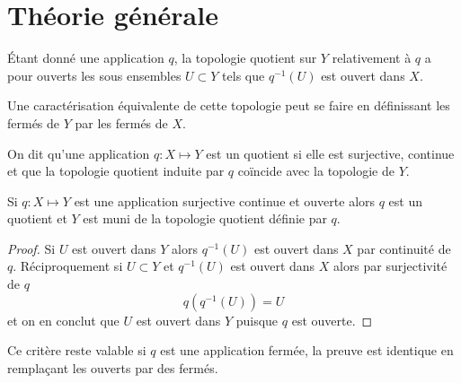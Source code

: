 \documentclass[main.tex]{subfiles}
\begin{document}
	\section{Théorie générale}
	\begin{definition}
		Étant donné une application $q$, la topologie quotient sur $Y$ relativement à $q$ a pour ouverts les sous ensembles $U \subset Y$ tels que $q^{-1}(U)$ est ouvert dans $X$.
	\end{definition}
	\begin{remark}
		Une caractérisation équivalente de cette topologie peut se faire en définissant les fermés de $Y$ par les fermés de $X$.
	\end{remark}
	\begin{definition}[Quotient]
		On dit qu'une application $q : X \longmapsto Y$ est un quotient si elle est surjective, continue et que la topologie quotient induite par $q$ coïncide avec la topologie de $Y$.	
	\end{definition}
	\begin{prop}
		Si $q : X \longmapsto Y$ est une application surjective continue et ouverte alors $q$ est un quotient et $Y$ est muni de la topologie quotient définie par $q$.
	\end{prop}
	\begin{proof}
		Si $U$ est ouvert dans $Y$ alors $q^{-1}(U)$ est ouvert dans $X$ par continuité de $q$. Réciproquement si  $ U \subset Y$ et $q^{-1}(U)$ est ouvert dans $X$ alors par surjectivité de $q$  \[
			q(q^{-1}(U)) = U
		\] et on en conclut que $U$ est ouvert dans $Y$ puisque $q$ est ouverte. 
	\end{proof}
	\begin{remark}
		Ce critère reste valable si $q$ est une application fermée, la preuve est identique en remplaçant les ouverts par des fermés.
	\end{remark}
\end{document}
